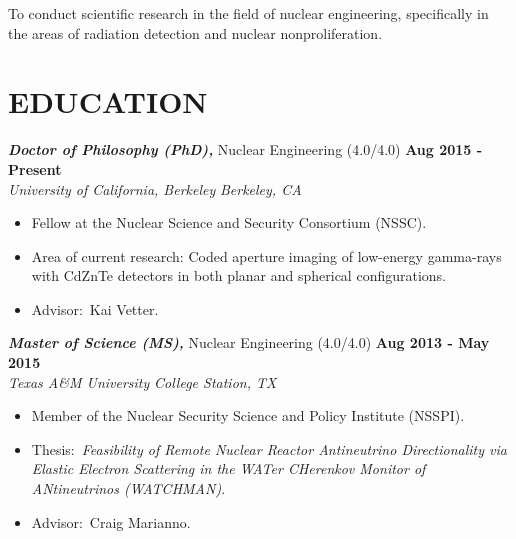 \documentclass[margin, 10pt]{style/res} %
\begin{document}
\begin{resume}
To conduct scientific research in the field of nuclear engineering, specifically in the areas of radiation detection and nuclear nonproliferation.





\section{\small{EDUCATION}}

{\sl\bf Doctor of Philosophy (PhD),} Nuclear Engineering (4.0/4.0) \hfill {\bf Aug 2015 - Present}\\
{\sl University of California, Berkeley} \hfill {\sl Berkeley, CA}
\vspace{2.5pt}
\begin{itemize}[leftmargin=4ex] \itemsep -2pt %
\item Fellow at the Nuclear Science and Security Consortium (NSSC).
\item Area of current research: Coded aperture imaging of low-energy gamma-rays with CdZnTe detectors in both planar and spherical configurations.
\item Advisor:~Kai Vetter.
\end{itemize}

{\sl\bf Master of Science (MS),} Nuclear Engineering (4.0/4.0) \hfill {\bf Aug 2013 - May 2015}\\
{\sl Texas A\&M University} \hfill {\sl College Station, TX}
\vspace{2.5pt}
\begin{itemize}[leftmargin=4ex] \itemsep -2pt %
\item Member of the Nuclear Security Science and Policy Institute (NSSPI).
\item Thesis:~\emph{Feasibility of Remote Nuclear Reactor Antineutrino Directionality via Elastic Electron Scattering in the WATer CHerenkov Monitor of ANtineutrinos (WATCHMAN)}.
\item Advisor:~Craig Marianno.
\end{itemize}


\end{resume}
\end{document}
